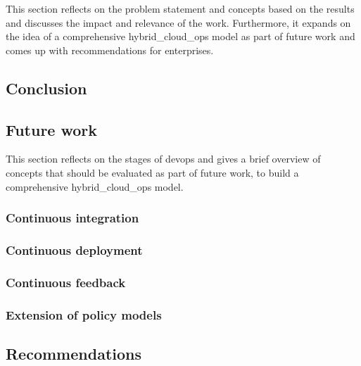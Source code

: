 \documentclass[../main.tex]{subfiles}
\begin{document}
    This section reflects on the problem statement and concepts based on the results and discusses the impact and relevance of the work.
    Furthermore, it expands on the idea of a comprehensive \gls{hybrid_cloud_ops} model as part of future work and comes up with recommendations for enterprises.

    \subsection{Conclusion}
    \label{subsec:out-conclusion}

    

    \subsection{Future work}
    \label{subsec:out-future}

    This section reflects on the stages of \gls{devops} and gives a brief overview of concepts that should be evaluated as part of future work, to build a comprehensive \gls{hybrid_cloud_ops} model.

    \subsubsection{Continuous integration}

    

    \subsubsection{Continuous deployment}

    

    \subsubsection{Continuous feedback}

    

    \subsubsection{Extension of policy models}

    

    \subsection{Recommendations}
    \label{subsec:out-recommend}

    
\end{document}
